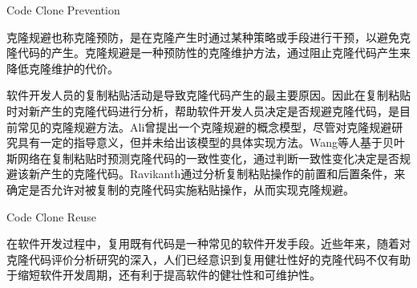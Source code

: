 
{Code Clone Prevention}

克隆规避也称克隆预防，是在克隆产生时通过某种策略或手段进行干预，以避免克隆代码的产生。克隆规避是一种预防性的克隆维护方法，通过阻止克隆代码产生来降低克隆维护的代价。

软件开发人员的复制粘贴活动是导致克隆代码产生的最主要原因。因此在复制粘贴时对新产生的克隆代码进行分析，帮助软件开发人员决定是否规避克隆代码，是目前常见的克隆规避方法。Ali曾提出一个克隆规避的概念模型\cite{ali2013enhancing}，尽管对克隆规避研究具有一定的指导意义，但并未给出该模型的具体实现方法。Wang等人基于贝叶斯网络在复制粘贴时预测克隆代码的一致性变化，通过判断一致性变化决定是否规避该新产生的克隆代码\cite{wang2012can}\cite{wang2014predicting}。Ravikanth通过分析复制粘贴操作的前置和后置条件，来确定是否允许对被复制的克隆代码实施粘贴操作，从而实现克隆规避\cite{venkatasubramanyam2012method}。


{Code Clone Reuse}

在软件开发过程中，复用既有代码是一种常见的软件开发手段。近些年来，随着对克隆代码评价分析研究的深入，人们已经意识到复用健壮性好的克隆代码不仅有助于缩短软件开发周期，还有利于提高软件的健壮性和可维护性。%

